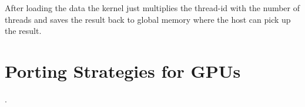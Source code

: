 After loading the data the kernel just multiplies the thread-id with the number
of threads and saves the result back to global memory where the host can pick up
the result.

\section{Porting Strategies for GPUs}.%
\label{sec:porting_strategies_for_gpu} 
